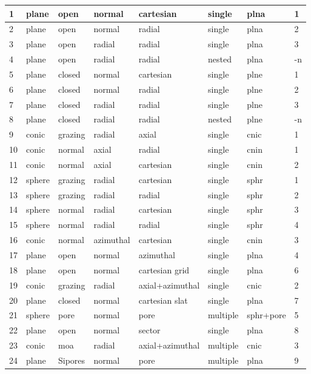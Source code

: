 \documentclass[letterpaper,10pt,english]{sphinxmanual}
\begin{document}
\begin{savenotes}
\begin{longtable}{|l|l|l|l|l|l|l|l|}
1
&
plane
&
open
&
normal
&
cartesian
&
single
&
plna
&
1
\\
\hline
2
&
plane
&
open
&
normal
&
radial
&
single
&
plna
&
2
\\
\hline
3
&
plane
&
open
&
radial
&
radial
&
single
&
plna
&
3
\\
\hline
4
&
plane
&
open
&
radial
&
radial
&
nested
&
plna
&
-n
\\
\hline
5
&
plane
&
closed
&
normal
&
cartesian
&
single
&
plne
&
1
\\
\hline
6
&
plane
&
closed
&
normal
&
radial
&
single
&
plne
&
2
\\
\hline
7
&
plane
&
closed
&
radial
&
radial
&
single
&
plne
&
3
\\
\hline
8
&
plane
&
closed
&
radial
&
radial
&
nested
&
plne
&
-n
\\
\hline
9
&
conic
&
grazing
&
radial
&
axial
&
single
&
cnic
&
1
\\
\hline
10
&
conic
&
normal
&
axial
&
radial
&
single
&
cnin
&
1
\\
\hline
11
&
conic
&
normal
&
axial
&
cartesian
&
single
&
cnin
&
2
\\
\hline
12
&
sphere
&
grazing
&
radial
&
cartesian
&
single
&
sphr
&
1
\\
\hline
13
&
sphere
&
grazing
&
radial
&
radial
&
single
&
sphr
&
2
\\
\hline
14
&
sphere
&
normal
&
radial
&
cartesian
&
single
&
sphr
&
3
\\
\hline
15
&
sphere
&
normal
&
radial
&
radial
&
single
&
sphr
&
4
\\
\hline
16
&
conic
&
normal
&
azimuthal
&
cartesian
&
single
&
cnin
&
3
\\
\hline
17
&
plane
&
open
&
normal
&
azimuthal
&
single
&
plna
&
4
\\
\hline
18
&
plane
&
open
&
normal
&
cartesian grid
&
single
&
plna
&
6
\\
\hline
19
&
conic
&
grazing
&
radial
&
axial+azimuthal
&
single
&
cnic
&
2
\\
\hline
20
&
plane
&
closed
&
normal
&
cartesian slat
&
single
&
plna
&
7
\\
\hline
21
&
sphere
&
pore
&
normal
&
pore
&
multiple
&
sphr+pore
&
5
\\
\hline
22
&
plane
&
open
&
normal
&
sector
&
single
&
plna
&
8
\\
\hline
23
&
conic
&
moa
&
radial
&
axial+azimuthal
&
multiple
&
cnic
&
3
\\
\hline
24
&
plane
&
Sipores
&
normal
&
pore
&
multiple
&
plna
&
9
\\

\end{longtable}
\end{savenotes}
\end{document}
